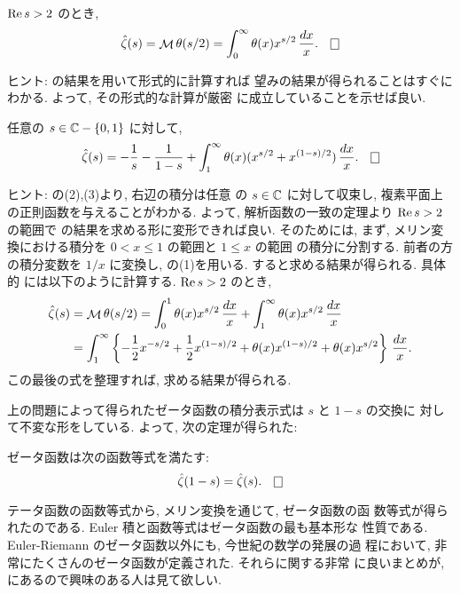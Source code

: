 \documentclass[12pt,twoside]{jarticle}
\begin{document}
\begin{question}[テータ函数とゼータ函数の関係]\label{q:Theta-and-Zeta}\qstar{*}
  $\mathop{\mathrm{Re}}\nolimits s > 2$ のとき,
  \[
    \hat\zeta(s)
    = \Mellin \theta(s/2)
    = \int_0^\infty \theta(x) x^{s/2}\,\frac{dx}{x}.
  \qed
  \]
\end{question}

\noindent ヒント:  の結果を用いて形式的に計算すれば
望みの結果が得られることはすぐにわかる. よって, その形式的な計算が厳密
に成立していることを示せば良い.

\begin{question}[積分表示式 2]\label{q:Zeta-int2}\qstar{*}
  任意の $s\in{\mathbb C} - \{0,1\}$ に対して, 
  \[
    \hat\zeta(s)
    =
    - \frac{1}{s}
    - \frac{1}{1-s}
    + \int_1^\infty \theta(x) (x^{s/2} + x^{(1-s)/2}) \,\frac{dx}{x}.
  \qed
  \]
\end{question}

\noindent ヒント: の(2),(3)より, 右辺の積分は任意
の $s\in{\mathbb C}$ に対して収束し, 複素平面上の正則函数を与えることがわかる. 
よって, 解析函数の一致の定理より $\mathop{\mathrm{Re}}\nolimits s > 2$ の範囲で 
 の結果を求める形に変形できれば良い. そのためには, 
まず, メリン変換における積分を $0 < x \le 1$ の範囲と $1\le x$ の範囲
の積分に分割する. 前者の方の積分変数を $1/x$ に変換し, %
の(1)を用いる. すると求める結果が得られる. 具体的
には以下のように計算する. $\mathop{\mathrm{Re}}\nolimits s > 2$ のとき,
\begin{align*}
  \hat\zeta(s)
  & = \mathop{\mathcal{M}}\nolimits \theta(s/2)
    = \int_0^1      \theta(x) x^{s/2}\,\frac{dx}{x}
    + \int_1^\infty \theta(x) x^{s/2}\,\frac{dx}{x}
  \\
  & = \int_1^\infty 
        \left\{
          - \frac{1}{2}x^{-s/2}
          + \frac{1}{2}x^{(1-s)/2}
          + \theta(x) x^{(1-s)/2}
          + \theta(x) x^{s/2}
        \right\}
      \,\frac{dx}{x}.
\end{align*}
この最後の式を整理すれば, 求める結果が得られる. 

上の問題によって得られたゼータ函数の積分表示式は $s$ と $1-s$ の交換に
対して不変な形をしている. よって, 次の定理が得られた:

\begin{Theorem}[ゼータ函数の函数等式]
  ゼータ函数は次の函数等式を満たす:
  \[
    \hat\zeta(1-s) = \hat\zeta(s).
  \qed
  \]
\end{Theorem}

\noindent テータ函数の函数等式から, メリン変換を通じて, ゼータ函数の函
数等式が得られたのである. Euler 積と函数等式はゼータ函数の最も基本形な
性質である. Euler-Riemann のゼータ函数以外にも, 今世紀の数学の発展の過
程において, 非常にたくさんのゼータ函数が定義された. それらに関する非常
に良いまとめが, \cite{Sugakujiten} にあるので興味のある人は見て欲しい. 
\end{document}
